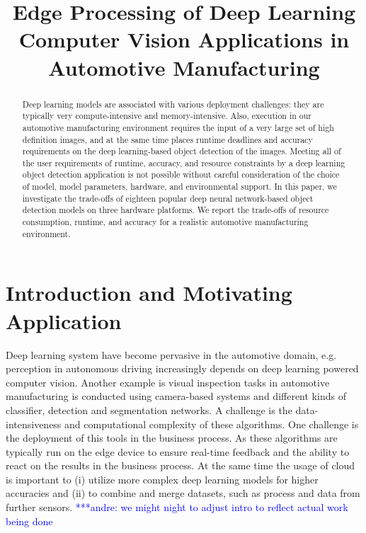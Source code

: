 \documentclass[conference]{IEEEtran}
\newcommand{\alnote}[1]{ {\textcolor{blue} { ***andre: #1 }}}
\newcommand{\alnote}[1]{}
\begin{document}
\title{Edge Processing of Deep Learning Computer Vision Applications in  Automotive Manufacturing}


\maketitle

\thispagestyle{plain}
\pagestyle{plain}



\begin{abstract}
Deep learning models are associated with various deployment challenges: they are typically very compute-intensive and memory-intensive.
Also, execution in our automotive manufacturing environment requires the input of a very large set of high definition images, and at the same time places runtime deadlines and accuracy requirements on the deep learning-based object detection of the images.
Meeting all of the user requirements of runtime, accuracy, and resource constraints by a deep learning object detection application is not possible without careful consideration of the choice of model, model parameters, hardware, and environmental support.
In this paper, we investigate the trade-offs of eighteen popular deep  neural network-based  object detection models on three hardware platforms.  
We report the trade-offs of resource consumption, runtime, and accuracy for a realistic automotive manufacturing environment.
\end{abstract}


\IEEEpeerreviewmaketitle

\nocite{*}

\section{Introduction and Motivating Application}

Deep learning system have become pervasive in the automotive domain, e.g. perception in autonomous driving increasingly depends on deep learning powered computer vision. Another example is visual inspection tasks in automotive manufacturing is conducted using camera-based systems and different kinds of classifier, detection and segmentation networks. A challenge is the data-intensiveness and computational complexity of these algorithms. One challenge is the deployment of this tools in the business process. As these algorithms are typically run on the edge device to ensure real-time feedback and the ability to react on the results in the business process. At the same time the usage of cloud is important to (i) utilize more complex deep learning models for higher accuracies and (ii) to combine and merge datasets, such as process and data from further sensors. \alnote{we might night to adjust intro to reflect actual work being done}
\end{document}
